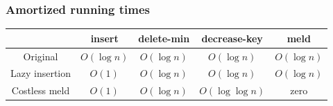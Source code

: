 \documentclass{beamer}
\begin{document}
\begin{frame}
\frametitle{Amortized running times}

\begin{tabular}{|c|c|c|c|c|}
\hline
& \textbf{insert} & \textbf{delete-min} & \textbf{decrease-key} & \textbf{meld} \\
\hline
Original & $O(\log n)$ & $O(\log n)$ & $O(\log n)$ & $O(\log n)$ \\
\hline
Lazy insertion & $O(1)$ & $O(\log n)$ & $O(\log n)$ & $O(\log n)$ \\
\hline
Costless meld & $O(1)$ & $O(\log n)$ & $O(\log \log n)$ & zero \\
\hline
\end{tabular}

\end{frame}
 
\end{document}
